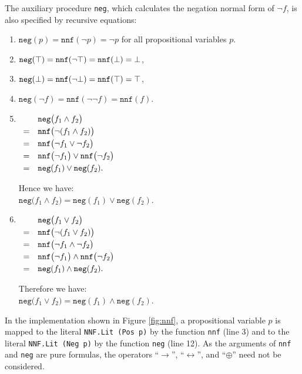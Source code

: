 The auxiliary procedure \texttt{neg}, which calculates the negation normal form of $\neg f$,
is also specified by recursive equations: 
\begin{enumerate}
\item $\texttt{neg}(p) = \texttt{nnf}(\neg p) = \neg p$ for all propositional variables $p$.
\item $\texttt{neg}(\top) = \texttt{nnf}(\neg\top) = \texttt{nnf}(\bot) = \bot$, 
\item $\texttt{neg}(\bot) = \texttt{nnf}(\neg\bot) = \texttt{nnf}(\top) = \top$,
\item $\texttt{neg}(\neg f) = \texttt{nnf}(\neg \neg f) = \texttt{nnf}(f)$.
\item $\begin{array}[t]{cl}
         & \texttt{neg}\bigl(f_1 \wedge f_2 \bigr) \\[0.1cm]
       = & \texttt{nnf}\bigl(\neg(f_1 \wedge f_2)\bigr) \\[0.1cm]
       = & \texttt{nnf}\bigl(\neg f_1 \vee \neg f_2\bigr) \\[0.1cm]
       = & \texttt{nnf}\bigl(\neg f_1\bigr) \vee \texttt{nnf}\bigl(\neg f_2\bigr) \\[0.1cm]
       = & \texttt{neg}(f_1) \vee \texttt{neg}(f_2).
       \end{array}
      $

      Hence we have:
      \\[0.2cm]
      \hspace*{1.3cm}
      $\texttt{neg}\bigl(f_1 \wedge f_2 \bigr) = \texttt{neg}(f_1) \vee \texttt{neg}(f_2)$.
\item $\begin{array}[t]{cl}
         & \texttt{neg}\bigl(f_1 \vee f_2 \bigr)        \\[0.1cm]
       = & \texttt{nnf}\bigl(\neg(f_1 \vee f_2) \bigr)  \\[0.1cm]
       = & \texttt{nnf}\bigl(\neg f_1 \wedge \neg f_2 \bigr)  \\[0.1cm]
       = & \texttt{nnf}\bigl(\neg f_1\bigr) \wedge \texttt{nnf}\bigl(\neg f_2 \bigr)  \\[0.1cm]
       = & \texttt{neg}(f_1) \wedge \texttt{neg}(f_2). 
       \end{array}
      $

      Therefore we have: 
      \\[0.2cm]
      \hspace*{1.3cm}
      $\texttt{neg}\bigl(f_1 \vee f_2 \bigr) = \texttt{neg}(f_1) \wedge \texttt{neg}(f_2)$.
\end{enumerate}
In the implementation shown in Figure \ref{fig:nnf}, a propositional variable $p$ is mapped to the literal
\texttt{NNF.Lit (Pos p)} by the function \texttt{nnf} (line 3) and to the literal \texttt{NNF.Lit (Neg p)} by
the function \texttt{neg} (line 12).  As the arguments of \texttt{nnf} and \texttt{neg} are pure formulas, the
operators ``$\rightarrow$'', ``$\leftrightarrow$'', and ``$\oplus$'' need not be considered.

